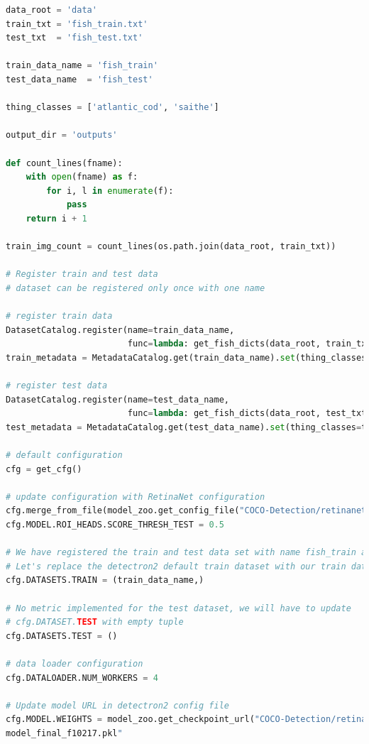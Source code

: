 \begin{lstlisting}[language=Python, caption=Konfigurasjon i train.py]
data_root = 'data'
train_txt = 'fish_train.txt'
test_txt  = 'fish_test.txt'

train_data_name = 'fish_train'
test_data_name  = 'fish_test'

thing_classes = ['atlantic_cod', 'saithe']

output_dir = 'outputs'

def count_lines(fname):
    with open(fname) as f:
        for i, l in enumerate(f):
            pass
    return i + 1

train_img_count = count_lines(os.path.join(data_root, train_txt))

# Register train and test data
# dataset can be registered only once with one name

# register train data
DatasetCatalog.register(name=train_data_name,
                        func=lambda: get_fish_dicts(data_root, train_txt))
train_metadata = MetadataCatalog.get(train_data_name).set(thing_classes=thing_classes)

# register test data
DatasetCatalog.register(name=test_data_name,
                        func=lambda: get_fish_dicts(data_root, test_txt))
test_metadata = MetadataCatalog.get(test_data_name).set(thing_classes=thing_classes)

# default configuration
cfg = get_cfg()

# update configuration with RetinaNet configuration
cfg.merge_from_file(model_zoo.get_config_file("COCO-Detection/retinanet_R_50_FPN_3x.yaml"))
cfg.MODEL.ROI_HEADS.SCORE_THRESH_TEST = 0.5

# We have registered the train and test data set with name fish_train and fish_test.
# Let's replace the detectron2 default train dataset with our train dataset.
cfg.DATASETS.TRAIN = (train_data_name,)

# No metric implemented for the test dataset, we will have to update
# cfg.DATASET.TEST with empty tuple
cfg.DATASETS.TEST = ()

# data loader configuration
cfg.DATALOADER.NUM_WORKERS = 4

# Update model URL in detectron2 config file
cfg.MODEL.WEIGHTS = model_zoo.get_checkpoint_url("COCO-Detection/retinanet_R_50_FPN_3x.yaml")
model_final_f10217.pkl"
\end{lstlisting}

